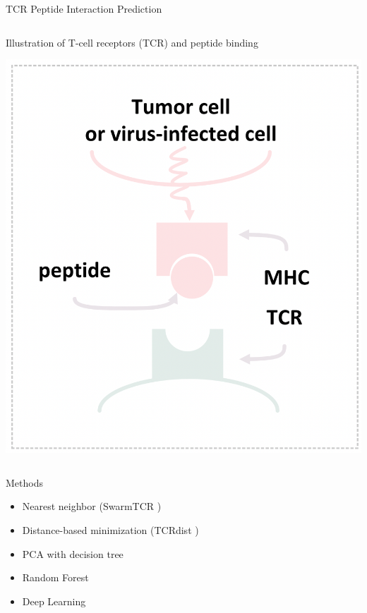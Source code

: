 \documentclass[aspectratio=1610,xcolor={dvipsnames},hyperref={colorlinks,unicode,linkcolor=violet,anchorcolor=blueviolet,citecolor=YellowOrange,filecolor=black,urlcolor=Aquamarine}]{beamer}
\begin{document}
\begin{frame}[label={sec:org7383039}]{TCR Peptide Interaction Prediction}
\begin{columns}
\begin{column}{0.4\columnwidth}
\begin{block}{Illustration of T-cell receptors (TCR) and peptide binding}
\begin{center}
\includegraphics[width=.9\linewidth]{./p1.png}
\end{center}
\end{block}
\end{column}
\end{columns}
\end{frame}

\begin{frame}[label={sec:org55d3065}]{Methods}
\begin{itemize}
\item Nearest neighbor (SwarmTCR )
\item Distance-based minimization (TCRdist )
\item PCA with decision tree 
\item Random Forest 
\item Deep Learning 
\end{itemize}
\end{frame}
\end{document}
